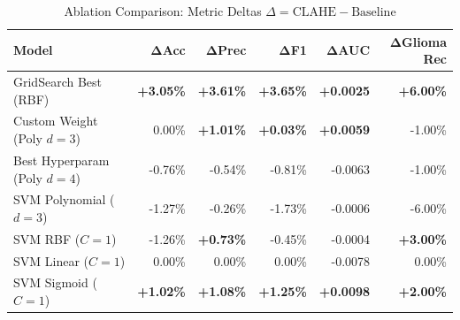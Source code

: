 \documentclass[conference]{IEEEtran}
\begin{document}
\begin{table}[t]
\centering
\caption{Ablation Comparison: Metric Deltas $\Delta = \text{CLAHE} - \text{Baseline}$}
\label{tab:delta_comparison}
\setlength{\tabcolsep}{3.8pt}
\begin{tabular}{lrrrrr}
\toprule
\textbf{Model} & $\boldsymbol{\Delta}$\textbf{Acc} & $\boldsymbol{\Delta}$\textbf{Prec} & $\boldsymbol{\Delta}$\textbf{F1} & $\boldsymbol{\Delta}$\textbf{AUC} & $\boldsymbol{\Delta}$\textbf{Glioma Rec} \\
\midrule
GridSearch Best (RBF)     & \textbf{+3.05\%} & \textbf{+3.61\%} & \textbf{+3.65\%} & \textbf{+0.0025} & \textbf{+6.00\%} \\
Custom Weight (Poly $d=3$)&  0.00\% & \textbf{+1.01\%} & \textbf{+0.03\%} & \textbf{+0.0059} & -1.00\% \\
Best Hyperparam (Poly $d=4$) & -0.76\% & -0.54\% & -0.81\% & -0.0063 & -1.00\% \\
SVM Polynomial ($d=3$)    & -1.27\% & -0.26\% & -1.73\% & -0.0006 & -6.00\% \\
SVM RBF ($C=1$)           & -1.26\% & \textbf{+0.73\%} & -0.45\% & -0.0004 & \textbf{+3.00\%} \\
SVM Linear ($C=1$)        &  0.00\% &  0.00\% &  0.00\% & -0.0078 &  0.00\% \\
SVM Sigmoid ($C=1$)       & \textbf{+1.02\%} & \textbf{+1.08\%} & \textbf{+1.25\%} & \textbf{+0.0098} & \textbf{+2.00\%} \\
\bottomrule
\end{tabular}
\end{table}
\end{document}

